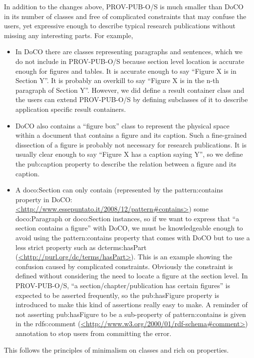 In addition to the changes above, PROV-PUB-O/S is much smaller than DoCO in its number of classes and free of complicated constraints that may confuse the users, yet expressive enough to describe typical research publications without missing any interesting parts. For example, 
\begin{itemize}
	\item In DoCO there are classes representing paragraphs and sentences, which we do not include in PROV-PUB-O/S because section level location is accurate enough for figures and tables. It is accurate enough to say ``Figure X is in Section Y''. It is probably an overkill to say ``Figure X is in the n-th paragraph of Section Y''. However, we did define a result container class and the users can extend PROV-PUB-O/S by defining subclasses of it to describe application specific result containers.
	\item DoCO also contains a ``figure box'' class to represent the physical space within a document that contains a figure and its caption. Such a fine-grained dissection of a figure is probably not necessary for research publications. It is usually clear enough to say ``Figure X has a caption saying Y'', so we define the pub:caption property to describe the relation between a figure and its caption.
	\item A doco:Section can only contain (represented by the pattern:contains property in DoCO: \url{<http://www.essepuntato.it/2008/12/pattern#contains>}) some doco:Paragraph or doco:Section instances, so if we want to express that ``a section contains a figure'' with DoCO, we must be knowledgeable enough to avoid using the pattern:contains property that comes with DoCO but to use a less strict property such as dcterms:hasPart (\url{<http://purl.org/dc/terms/hasPart>}). This is an example showing the confusion caused by complicated constraints. Obviously the constraint is defined without considering the need to locate a figure at the section level. In PROV-PUB-O/S, ``a section/chapter/publication has certain figures'' is expected to be asserted frequently, so the pub:hasFigure property is introduced to make this kind of assertions really easy to make. A reminder of not asserting pub:hasFigure to be a sub-property of pattern:contains is given in the rdfs:comment (\url{<http://www.w3.org/2000/01/rdf-schema#comment>}) annotation to stop users from committing the error. 
\end{itemize}
This follows the principles of minimalism on classes and rich on properties.

